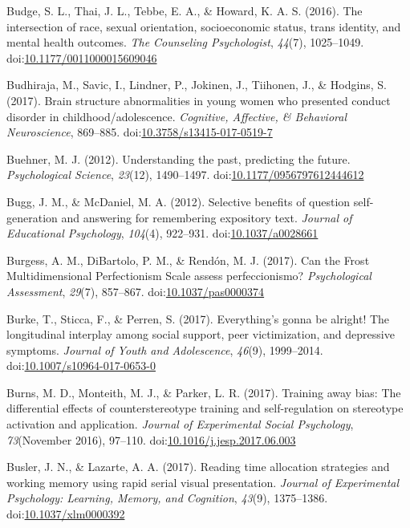 \documentclass[english,man]{apa6}
\theoremstyle{definition}
\theoremstyle{definition}
\theoremstyle{definition}
\theoremstyle{remark}
\begin{document}
\hypertarget{ref-Budge2016}{}
Budge, S. L., Thai, J. L., Tebbe, E. A., \& Howard, K. A. S. (2016). The
intersection of race, sexual orientation, socioeconomic status, trans
identity, and mental health outcomes. \emph{The Counseling
Psychologist}, \emph{44}(7), 1025--1049.
doi:\href{https://doi.org/10.1177/0011000015609046}{10.1177/0011000015609046}

\hypertarget{ref-Budhiraja2017}{}
Budhiraja, M., Savic, I., Lindner, P., Jokinen, J., Tiihonen, J., \&
Hodgins, S. (2017). Brain structure abnormalities in young women who
presented conduct disorder in childhood/adolescence. \emph{Cognitive,
Affective, \& Behavioral Neuroscience}, 869--885.
doi:\href{https://doi.org/10.3758/s13415-017-0519-7}{10.3758/s13415-017-0519-7}

\hypertarget{ref-Buehner2012}{}
Buehner, M. J. (2012). Understanding the past, predicting the future.
\emph{Psychological Science}, \emph{23}(12), 1490--1497.
doi:\href{https://doi.org/10.1177/0956797612444612}{10.1177/0956797612444612}

\hypertarget{ref-Bugg2012}{}
Bugg, J. M., \& McDaniel, M. A. (2012). Selective benefits of question
self-generation and answering for remembering expository text.
\emph{Journal of Educational Psychology}, \emph{104}(4), 922--931.
doi:\href{https://doi.org/10.1037/a0028661}{10.1037/a0028661}

\hypertarget{ref-Burgess2017}{}
Burgess, A. M., DiBartolo, P. M., \& Rendón, M. J. (2017). Can the Frost
Multidimensional Perfectionism Scale assess perfeccionismo?
\emph{Psychological Assessment}, \emph{29}(7), 857--867.
doi:\href{https://doi.org/10.1037/pas0000374}{10.1037/pas0000374}

\hypertarget{ref-Burke2017}{}
Burke, T., Sticca, F., \& Perren, S. (2017). Everything's gonna be
alright! The longitudinal interplay among social support, peer
victimization, and depressive symptoms. \emph{Journal of Youth and
Adolescence}, \emph{46}(9), 1999--2014.
doi:\href{https://doi.org/10.1007/s10964-017-0653-0}{10.1007/s10964-017-0653-0}

\hypertarget{ref-Burns2017}{}
Burns, M. D., Monteith, M. J., \& Parker, L. R. (2017). Training away
bias: The differential effects of counterstereotype training and
self-regulation on stereotype activation and application. \emph{Journal
of Experimental Social Psychology}, \emph{73}(November 2016), 97--110.
doi:\href{https://doi.org/10.1016/j.jesp.2017.06.003}{10.1016/j.jesp.2017.06.003}

\hypertarget{ref-Busler2017}{}
Busler, J. N., \& Lazarte, A. A. (2017). Reading time allocation
strategies and working memory using rapid serial visual presentation.
\emph{Journal of Experimental Psychology: Learning, Memory, and
Cognition}, \emph{43}(9), 1375--1386.
doi:\href{https://doi.org/10.1037/xlm0000392}{10.1037/xlm0000392}
\end{document}
